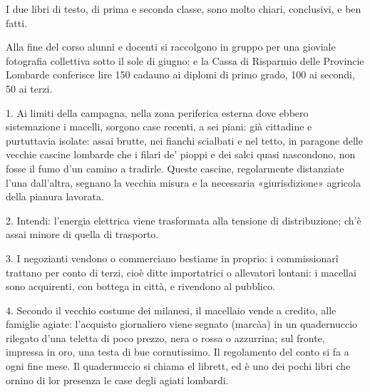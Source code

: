 I due libri di testo, di prima e seconda classe, sono molto chiari, conclusivi, e ben fatti.

Alla fine del corso alunni e docenti si raccolgono in gruppo per una gioviale fotografia collettiva sotto il sole di giugno: e la Cassa di Risparmio delle Provincie Lombarde conferisce lire 150 cadauno ai diplomi di primo grado, 100 ai secondi, 50 ai terzi.



1. Ai limiti della campagna, nella zona periferica esterna dove ebbero sistemazione i macelli, sorgono case recenti, a sei piani: già cittadine e purtuttavia isolate: assai brutte, nei fianchi scialbati e nel tetto, in paragone delle vecchie cascine lombarde che i filari de’ pioppi e dei salci quasi nascondono, non fosse il fumo d’un camino a tradirle. Queste cascine, regolarmente distanziate l’una dall’altra, segnano la vecchia misura e la necessaria «giurisdizione» agricola della pianura lavorata.

2. Intendi: l’energia elettrica viene trasformata alla tensione di distribuzione; ch’è assai minore di quella di trasporto.

3. I negozianti vendono o commerciano bestiame in proprio: i commissionarî trattano per conto di terzi, cioè ditte importatrici o allevatori lontani: i macellai sono acquirenti, con bottega in città, e rivendono al pubblico.

4. Secondo il vecchio costume dei milanesi, il macellaio vende a credito, alle famiglie agiate: l’acquisto giornaliero viene segnato (marcàa) in un quadernuccio rilegato d’una teletta di poco prezzo, nera o rossa o azzurrina; sul fronte, impressa in oro, una testa di bue cornutissimo. Il regolamento del conto si fa a ogni fine mese. Il quadernuccio si chiama el librett, ed è uno dei pochi libri che ornino di lor presenza le case degli agiati lombardi. 